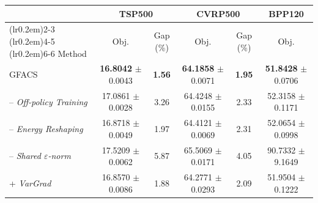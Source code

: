 
\begin{tabular}{lccccc}
\toprule[1.0pt]
\multicolumn{1}{c}{} & \multicolumn{2}{c}{TSP500} & \multicolumn{2}{c}{CVRP500} & \multicolumn{1}{c}{BPP120}
\\
\cmidrule[0.5pt](lr{0.2em}){2-3}
\cmidrule[0.5pt](lr{0.2em}){4-5}
\cmidrule[0.5pt](lr{0.2em}){6-6}
Method & Obj. & Gap (\%) & Obj. & Gap (\%) & Obj. \\
\midrule
GFACS & \textbf{16.8042} $\pm$ 0.0043 & \textbf{1.56} & \textbf{64.1858} $\pm$ 0.0071 & \textbf{1.95} & \textbf{51.8428} $\pm$ 0.0706 \\
\quad -- \textit{Off-policy Training} & 17.0861 $\pm$ 0.0028 & 3.26 & 64.4248 $\pm$ 0.0155 & 2.33 & 52.3158 $\pm$ 0.1171 \\
\quad -- \textit{Energy Reshaping} & 16.8718 $\pm$ 0.0049 & 1.97 & 64.4121 $\pm$ 0.0069 & 2.31 & 52.0654 $\pm$ 0.0998 \\
\quad -- \textit{Shared $\varepsilon$-norm} & 17.5209 $\pm$ 0.0062 & 5.87 & 65.5069 $\pm$ 0.0171 & 4.05 & 90.7332 $\pm$ 9.1649 \\
\quad\quad + \textit{VarGrad} \cite{zhang2022robust} & 16.8570 $\pm$ 0.0086 & 1.88 & 64.2771 $\pm$ 0.0293 & 2.09 & 51.9504 $\pm$ 0.1222 \\
\bottomrule[1.0pt]
\end{tabular}

